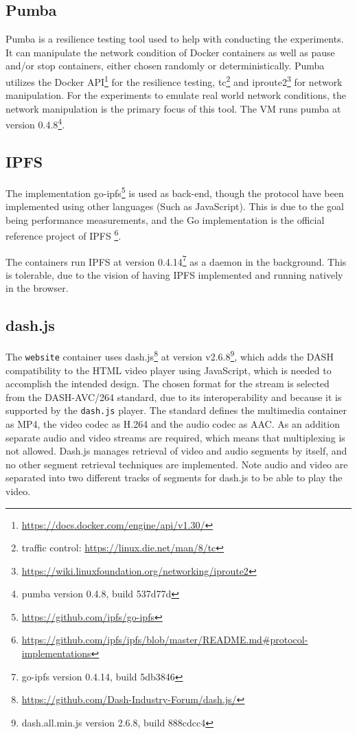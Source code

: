 \subsection{Pumba}
\label{sec:setup_pumba}
Pumba is a resilience testing tool used to help with conducting the experiments. It can manipulate the network condition of Docker containers as well as pause and/or stop containers, either chosen randomly or deterministically. Pumba utilizes the Docker \ac{API}\footnote{\url{https://docs.docker.com/engine/api/v1.30/}} for the resilience testing, tc\footnote{traffic control: \url{https://linux.die.net/man/8/tc}} and iproute2\footnote{\url{https://wiki.linuxfoundation.org/networking/iproute2}} for network manipulation. For the experiments to emulate real world network conditions, the network manipulation is the primary focus of this tool.
The \ac{VM} runs pumba at version 0.4.8\footnote{pumba version 0.4.8, build 537d77d}. 

\subsection{IPFS}
\label{sec:setup_ipfs}
The implementation go-ipfs\footnote{\url{https://github.com/ipfs/go-ipfs}} is used as back-end, though the protocol have been implemented using other languages (Such as JavaScript). 
This is due to the goal being performance measurements, and the Go implementation is the official reference project of \ac{IPFS} \footnote{\url{https://github.com/ipfs/ipfs/blob/master/README.md\#protocol-implementations}}.

The containers run \ac{IPFS} at version 0.4.14\footnote{go-ipfs version 0.4.14, build 5db3846} as a daemon in the background. This is tolerable, due to the vision of having \ac{IPFS} implemented and running natively in the browser.


\subsection{dash.js}
\label{sec:setup_dash.js}
The \texttt{website} container uses dash.js\footnote{\url{https://github.com/Dash-Industry-Forum/dash.js/}} at version v2.6.8\footnote{dash.all.min.js version 2.6.8, build 888cdcc4}, which adds the \ac{DASH} compatibility to the \ac{HTML} video player using JavaScript, which is needed to accomplish the intended design.
The chosen format for the stream is selected from the DASH-AVC/264 standard\cite{dash264}, due to its interoperability and because it is supported by the \texttt{dash.js} player.
The standard defines the multimedia container as MP4, the video codec as H.264 and the audio codec as AAC. As an addition separate audio and video streams are required, which means that multiplexing is not allowed.
Dash.js manages retrieval of video and audio segments by itself, and no other segment retrieval techniques are implemented. Note audio and video are separated into two different tracks of segments for dash.js to be able to play the video.

